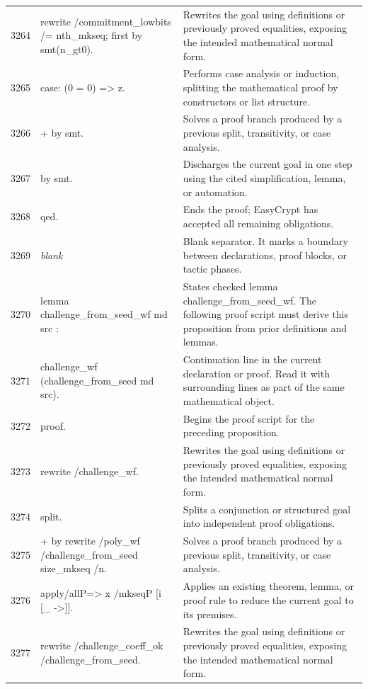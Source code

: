 \documentclass[10pt]{article}
\begin{document}
\begin{longtable}{r L{0.53\textwidth} L{0.37\textwidth}}
3264 & {\ttfamily\scriptsize rewrite /commitment\_lowbits /= nth\_mkseq; first by smt(n\_gt0).} & Rewrites the goal using definitions or previously proved equalities, exposing the intended mathematical normal form. \\
3265 & {\ttfamily\scriptsize case: (0 = 0) => z.} & Performs case analysis or induction, splitting the mathematical proof by constructors or list structure. \\
3266 & {\ttfamily\scriptsize + by smt.} & Solves a proof branch produced by a previous split, transitivity, or case analysis. \\
3267 & {\ttfamily\scriptsize by smt.} & Discharges the current goal in one step using the cited simplification, lemma, or automation. \\
3268 & {\ttfamily\scriptsize qed.} & Ends the proof; EasyCrypt has accepted all remaining obligations. \\
3269 & {\ttfamily\scriptsize \emph{blank}} & Blank separator.  It marks a boundary between declarations, proof blocks, or tactic phases. \\
3270 & {\ttfamily\scriptsize lemma challenge\_from\_seed\_wf md src :} & States checked lemma challenge\_from\_seed\_wf.  The following proof script must derive this proposition from prior definitions and lemmas. \\
3271 & {\ttfamily\scriptsize   challenge\_wf (challenge\_from\_seed md src).} & Continuation line in the current declaration or proof.  Read it with surrounding lines as part of the same mathematical object. \\
3272 & {\ttfamily\scriptsize proof.} & Begins the proof script for the preceding proposition. \\
3273 & {\ttfamily\scriptsize rewrite /challenge\_wf.} & Rewrites the goal using definitions or previously proved equalities, exposing the intended mathematical normal form. \\
3274 & {\ttfamily\scriptsize split.} & Splits a conjunction or structured goal into independent proof obligations. \\
3275 & {\ttfamily\scriptsize + by rewrite /poly\_wf /challenge\_from\_seed size\_mkseq /n.} & Solves a proof branch produced by a previous split, transitivity, or case analysis. \\
3276 & {\ttfamily\scriptsize apply/allP=> x /mkseqP [i [\_ ->]].} & Applies an existing theorem, lemma, or proof rule to reduce the current goal to its premises. \\
3277 & {\ttfamily\scriptsize rewrite /challenge\_coeff\_ok /challenge\_from\_seed.} & Rewrites the goal using definitions or previously proved equalities, exposing the intended mathematical normal form. \\

\end{longtable}
\end{document}
